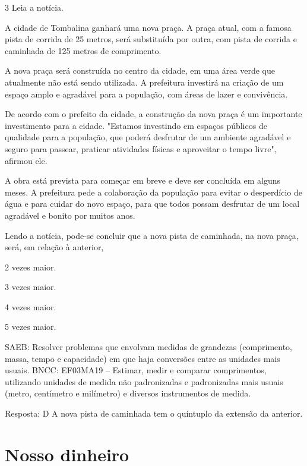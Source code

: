 \begin{multicols}{2}
\num{3} Leia a notícia.


A cidade de Tombalina ganhará uma nova praça. A praça atual, com a famosa pista de corrida de 25 metros, será substituída por outra, com pista de corrida e caminhada de 125 metros de comprimento.

A nova praça será construída no centro da cidade, em uma área verde que atualmente não está sendo utilizada. A prefeitura investirá na criação de um espaço amplo e agradável para a população, com áreas de lazer e convivência.

De acordo com o prefeito da cidade, a construção da nova praça é um importante investimento para a cidade. "Estamos investindo em espaços públicos de qualidade para a população, que poderá desfrutar de um ambiente agradável e seguro para passear, praticar atividades físicas e aproveitar o tempo livre", afirmou ele.

A obra está prevista para começar em breve e deve ser concluída em alguns meses. A prefeitura pede a colaboração da população para evitar o desperdício de água e para cuidar do novo espaço, para que todos possam desfrutar de um local agradável e bonito por muitos anos.


Lendo a notícia, pode-se concluir que a nova pista de caminhada, na nova praça, será, em relação à anterior,

\begin{escolha}
\item
  2 vezes maior.
\item
  3 vezes maior.
\item
  4 vezes maior.
\item
  5 vezes maior.
\end{escolha}

SAEB: Resolver problemas que envolvam medidas de grandezas (comprimento, massa, tempo e capacidade) em que haja conversões entre as unidades mais usuais. 
BNCC: EF03MA19 -- Estimar, medir e comparar comprimentos, utilizando unidades de medida
não padronizadas e padronizadas mais usuais (metro, centímetro e milímetro) e diversos
instrumentos de medida.


Resposta: D
A nova pista de caminhada tem o quíntuplo da extensão da anterior.

\chapter{Nosso dinheiro}


\end{multicols}
